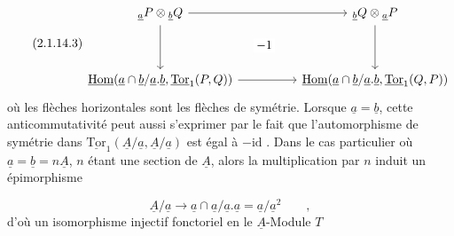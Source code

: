 \begin{equation}\tag{2.1.14.3}
\begin{tikzcd}[column sep=huge, row sep=huge]
{{}_{\underline{a}}P \otimes {}_{\underline{b}}Q} \arrow[r] \arrow[d] \arrow[rd, phantom, "-1" description] & {{}_{\underline{b}}Q \otimes {}_{\underline{a}}P} \arrow[d] \\
{\underline{\mathrm{Hom}}(\underline{a} \cap \underline{b}/\underline{a}.\underline{b},\underline{\mathrm{Tor}}_1(P,Q))} \arrow[r] & {\underline{\mathrm{Hom}}(\underline{a} \cap \underline{b}/\underline{a}.\underline{b},\underline{\mathrm{Tor}}_1(Q,P))}
\end{tikzcd}
\end{equation}
où les flèches horizontales sont les flèches de symétrie. Lorsque $\underline{a}=\underline{b}$, cette anticommutativité peut aussi s'exprimer par le fait que l'automorphisme de symétrie dans $\underline{\mathrm{Tor}}_1(\underline{A}/\underline{a},\underline{A}/\underline{a})$ est égal à $-\mathrm{id}$ . Dans le cas particulier où $\underline{a} = \underline{b} = n\underline{A}$, $n$ étant une section de $\underline{A}$, alors la multiplication par $n$ induit un épimorphisme

\begin{equation*}
\underline{A}/\underline{a} \longrightarrow \underline{a} \cap \underline{a}/\underline{a}.\underline{a} = \underline{a}/\underline{a}^2 \qquad ,
\end{equation*}
d'où un isomorphisme injectif fonctoriel en le $\underline{A}$-Module $T$ 


